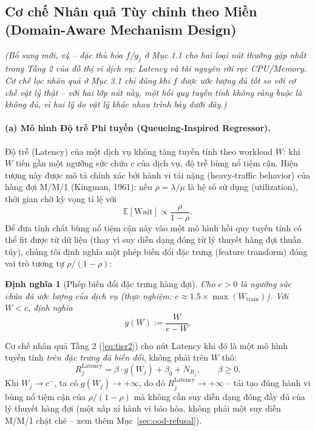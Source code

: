 \documentclass[11pt,a4paper]{article}
\newtheorem{definition}{Định nghĩa}
\begin{document}
\subsection{Cơ chế Nhân quả Tùy chỉnh theo Miền (Domain-Aware Mechanism Design)}
\label{sec:domain-aware}
\textit{(Bổ sung mới, v4 -- đặc thù hóa $f$/$g_j$ ở Mục 1.1 cho hai loại nút thường gặp nhất trong Tầng 2 của đồ thị vi dịch vụ: Latency và tài nguyên rời rạc CPU/Memory. Cơ chế lọc nhân quả ở Mục 3.1 chỉ đúng khi $f$ được ước lượng đủ tốt so với cơ chế vật lý thật -- với hai lớp nút này, một hồi quy tuyến tính không ràng buộc là không đủ, vì hai lý do vật lý khác nhau trình bày dưới đây.)}

\paragraph{(a) Mô hình Độ trễ Phi tuyến (Queueing-Inspired Regressor).}
Độ trễ (Latency) của một dịch vụ không tăng tuyến tính theo workload $W$: khi $W$ tiến gần một ngưỡng sức chứa $c$ của dịch vụ, độ trễ bùng nổ tiệm cận. Hiện tượng này được mô tả chính xác bởi hành vi tải nặng (heavy-traffic behavior) của hàng đợi M/M/1 (Kingman, 1961): nếu $\rho = \lambda/\mu$ là hệ số sử dụng (utilization), thời gian chờ kỳ vọng tỉ lệ với
\begin{equation}
\mathbb{E}[\text{Wait}] \propto \frac{\rho}{1-\rho}.
\end{equation}
Để đưa tính chất bùng nổ tiệm cận này vào một mô hình hồi quy tuyến tính có thể fit được từ dữ liệu (thay vì suy diễn dạng đóng từ lý thuyết hàng đợi thuần túy), chúng tôi định nghĩa một phép biến đổi đặc trưng (feature transform) đóng vai trò tương tự $\rho/(1-\rho)$:
\begin{definition}[Phép biến đổi đặc trưng hàng đợi]
Cho $c > 0$ là ngưỡng sức chứa đã ước lượng của dịch vụ (thực nghiệm: $c \approx 1.5 \times \max(W_{\text{train}})$). Với $W < c$, định nghĩa
\begin{equation}
g(W) := \frac{W}{c - W}.
\end{equation}
\end{definition}
Cơ chế nhân quả Tầng 2 (\ref{eq:tier2}) cho nút Latency khi đó là một mô hình tuyến tính \emph{trên đặc trưng đã biến đổi}, không phải trên $W$ thô:
\begin{equation}
R_j^{\text{Latency}} = \beta \cdot g(W_j) + \beta_0 + N_{R_j}, \qquad \beta \geq 0.
\end{equation}
Khi $W_j \to c^-$, ta có $g(W_j) \to +\infty$, do đó $R_j^{\text{Latency}} \to +\infty$ -- tái tạo đúng hành vi bùng nổ tiệm cận của $\rho/(1-\rho)$ mà không cần suy diễn dạng đóng đầy đủ của lý thuyết hàng đợi (một xấp xỉ hành vi bão hòa, không phải một suy diễn M/M/1 chặt chẽ -- xem thêm Mục~\ref{sec:ood-refusal}).
\end{document}
